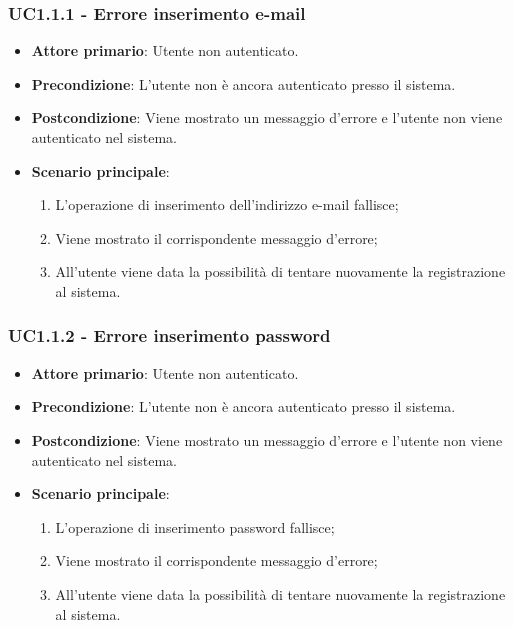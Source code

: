 \subsubsection{UC1.1.1 - Errore inserimento e-mail}
\begin{itemize}
\item \textbf{Attore primario}: Utente non autenticato.
\item \textbf{Precondizione}: L'utente non è ancora autenticato presso il sistema.
\item \textbf{Postcondizione}: Viene mostrato un messaggio d'errore e l'utente non viene autenticato nel sistema.

\item \textbf{Scenario principale}:
\begin{enumerate}
\item L'operazione di inserimento dell'indirizzo e-mail fallisce;
\item Viene mostrato il corrispondente messaggio d'errore;
\item All'utente viene data la possibilità di tentare nuovamente la registrazione al sistema.
\end{enumerate}
\end{itemize}

\subsubsection{UC1.1.2 - Errore inserimento password}
\begin{itemize}
\item \textbf{Attore primario}: Utente non autenticato.
\item \textbf{Precondizione}: L'utente non è ancora autenticato presso il sistema.
\item \textbf{Postcondizione}: Viene mostrato un messaggio d'errore e l'utente non viene autenticato nel sistema.

\item \textbf{Scenario principale}:
\begin{enumerate}
\item L'operazione di inserimento password fallisce;
\item Viene mostrato il corrispondente messaggio d'errore;
\item All'utente viene data la possibilità di tentare nuovamente la registrazione al sistema.
\end{enumerate}
\end{itemize}

